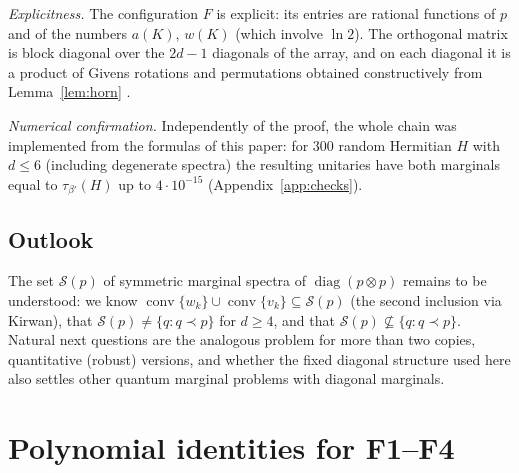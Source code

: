 \documentclass[11pt]{amsart}
\theoremstyle{definition}
\theoremstyle{remark}
\numberwithin{equation}{section}
\newcommand{\diag}{\operatorname{diag}}
\newcommand{\conv}{\operatorname{conv}}
\begin{document}
\emph{Explicitness.} The configuration $F$ is explicit: its entries are rational functions of $p$ and
of the numbers $a(K)$, $w(K)$ (which involve $\ln 2$). The orthogonal matrix is block diagonal over the
$2d-1$ diagonals of the array, and on each diagonal it is a product of Givens rotations and permutations
obtained constructively from Lemma~\ref{lem:horn} \cite{ChanLi1983}.

\emph{Numerical confirmation.} Independently of the proof, the whole chain was implemented from the
formulas of this paper: for $300$ random Hermitian $H$ with $d\le6$ (including degenerate spectra) the
resulting unitaries have both marginals equal to $\tau_{\beta'}(H)$ up to $4\cdot10^{-15}$
(Appendix~\ref{app:checks}).

\subsection{Outlook}
The set $\mathcal S(p)$ of symmetric marginal spectra of $\diag(p\otimes p)$ remains to be understood: we
know $\conv\{w_k\}\cup\conv\{v_k\}\subseteq\mathcal S(p)$ (the second inclusion via Kirwan), that
$\mathcal S(p)\ne\{q:q\prec p\}$ for $d\ge4$, and that $\mathcal S(p)\not\subseteq\{q:q\prec p\}$. Natural
next questions are the analogous problem for more than two copies, quantitative (robust) versions, and
whether the fixed diagonal structure used here also settles other quantum marginal problems with
diagonal marginals.


\appendix
\section{Polynomial identities for F1--F4}\label{app:poly}
\end{document}
